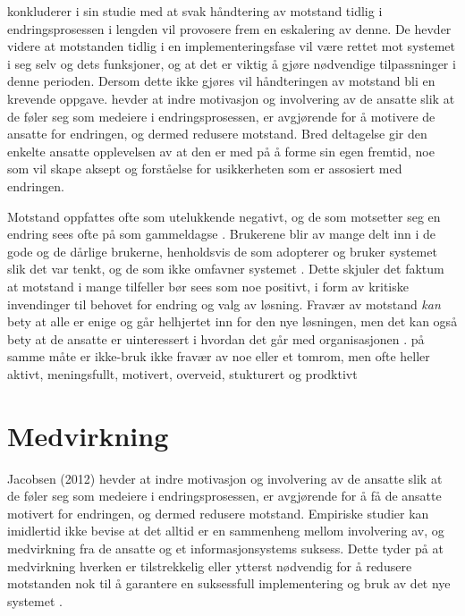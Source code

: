 \noindent
\citet{Lapointe05} konkluderer i sin studie med at svak håndtering av motstand tidlig i endringsprosessen i lengden vil provosere frem en eskalering av denne. De hevder videre at motstanden tidlig i en implementeringsfase vil være rettet mot systemet i seg selv og dets funksjoner, og at det er viktig å gjøre nødvendige tilpassninger i denne perioden. Dersom dette ikke gjøres vil håndteringen av motstand bli en krevende oppgave. \citet{Jacobsen12} hevder at indre motivasjon og involvering av de ansatte slik at de føler seg som medeiere i endringsprosessen, er avgjørende for å motivere de ansatte for endringen, og dermed redusere motstand. Bred deltagelse gir den enkelte ansatte opplevelsen av at den er med på å forme sin egen fremtid, noe som vil skape aksept og forståelse for usikkerheten som er assosiert med endringen.

\noindent
Motstand oppfattes ofte som utelukkende negativt, og de som motsetter seg en endring sees ofte på som gammeldagse \citep{Jacobsen12}. Brukerene blir av mange delt inn i de gode og de dårlige brukerne, henholdsvis de som adopterer og bruker systemet slik det var tenkt, og de som ikke omfavner systemet \citep{Satchell09}. Dette skjuler det faktum at motstand i mange tilfeller bør sees som noe positivt, i form av kritiske invendinger til behovet for endring og valg av løsning. Fravær av motstand \emph{kan} bety at alle er enige og går helhjertet inn for den nye løsningen, men det kan også bety at de ansatte er uinteressert i hvordan det går med organisasjonen \citep{Jacobsen12}. på samme måte er ikke-bruk ikke fravær av noe eller et tomrom, men ofte heller aktivt, meningsfullt, motivert, overveid, stukturert og prodktivt \citep{Satchell09}

\section{Medvirkning}
\label{sec:medvirkning}
Jacobsen (2012) hevder at indre motivasjon og involvering av de ansatte slik at de føler seg som medeiere i endringsprosessen, er avgjørende for å få de ansatte motivert for endringen, og dermed redusere motstand.
Empiriske studier kan imidlertid ikke bevise at det alltid er en sammenheng mellom involvering av, og medvirkning fra de ansatte og et informasjonsystems suksess. Dette tyder på at medvirkning hverken er tilstrekkelig eller ytterst nødvendig for å redusere motstanden nok til å garantere en suksessfull implementering og bruk av det nye systemet \citep{Cavaye95}. 

